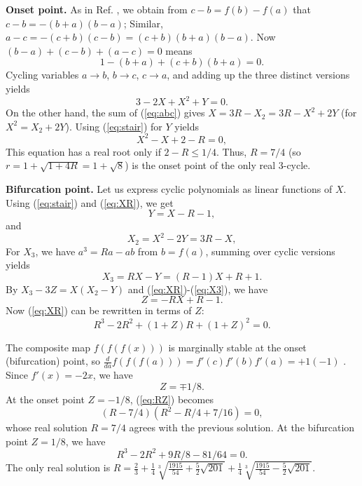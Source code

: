 \documentclass[twocolumn,prl]{revtex4-1}
\begin{document}
\textbf{Onset point.}
%
As in Ref. \cite{zhang},
we obtain from $c - b = f(b) - f(a)$ that
$c-b = -(b+a)(b-a)$;
Similar,
$a-c = -(c+b)(c-b)=(c+b)(b+a)(b-a)$.
Now $(b-a) + (c-b) + (a-c) = 0$ means
\[
1 - (b+a) + (c+b)(b+a) = 0.
\]
Cycling variables
$a\rightarrow b$,
$b\rightarrow c$,
$c\rightarrow a$,
and adding up the three distinct versions yields
\begin{equation}
3 - 2X + X^2 + Y = 0.
\label{eq:stair}
\end{equation}
%
On the other hand, the sum of (\ref{eq:abc}) gives
$X = 3R - X_2 = 3R - X^2 + 2Y$ (for $X^2 = X_2 + 2 Y$).
%
Using (\ref{eq:stair}) for $Y$ yields
\begin{equation}
  X^2 - X + 2 - R = 0,
\label{eq:XR}
\end{equation}
This equation has a real root only if $2 - R \le 1/4$.
Thus, $R = 7/4$ (so $r = 1+\sqrt{1+4R} = 1+ \sqrt 8$)
is the onset point of the only real 3-cycle.



\textbf{Bifurcation point.}
%
Let us express cyclic polynomials as linear functions of $X$.
Using (\ref{eq:stair}) and (\ref{eq:XR}), we get
\begin{equation}
  Y  = X - R - 1,
\label{eq:Y}
\end{equation}
and
\begin{equation}
  X_2  = X^2 - 2Y = 3R-X,
\label{eq:X2}
\end{equation}
%
For $X_3$,
we have $a^3 = R a - ab$ from $b = f(a)$,
summing over cyclic versions yields
\begin{equation}
X_3 = R X - Y = (R-1) X + R + 1.
\label{eq:X3}
\end{equation}
%
By 
$X_3 - 3 Z = X (X_2 - Y)$ and
(\ref{eq:XR})-(\ref{eq:X3}),
we have
\begin{equation}
Z = -RX + R - 1.
\label{eq:Z}
\end{equation}
Now (\ref{eq:XR}) can be rewritten in terms of $Z$:
\begin{equation}
  R^3 - 2R^2 + (1+Z)R + (1+Z)^2 = 0.
\label{eq:RZ}
\end{equation}

The composite map $f(f(f(x)))$ is marginally stable
at the onset (bifurcation) point, so
$\frac{d}{da}f(f(f(a))) = f'(c)f'(b)f'(a) = +1 (-1)$
\cite{saha}.
Since $f'(x) = -2x$, we have
\begin{equation}
  Z = \mp1/8.
\label{eq:Zder}
\end{equation}
%
At the onset point $Z = -1/8$, (\ref{eq:RZ}) becomes
\[
  (R-7/4) (R^2 - R/4 + 7/16) = 0,
\]
whose real solution $R = 7/4$ agrees with the previous solution.
%
At the bifurcation point $Z = 1/8$, we have
\[
  R^3 - 2 R^2 + 9R/8 - 81/64 = 0.
\]
The only real solution is
$
R = \frac{2}{3}
  +\frac{1}{4} \sqrt[3]{ \frac{1915}{54} + \frac{5}{2} \sqrt{201}}
  +\frac{1}{4} \sqrt[3]{ \frac{1915}{54} - \frac{5}{2} \sqrt{201}}.
$
\end{document}
